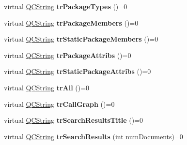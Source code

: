 \begin{DoxyCompactItemize}
\item 
\mbox{\label{class_translator_ad3328af2789b15e01a5050ffc7851d47}} 
virtual \mbox{\hyperlink{class_q_c_string}{Q\+C\+String}} {\bfseries tr\+Package\+Types} ()=0
\item 
\mbox{\label{class_translator_a55faa09f74a1f8abfcda6c3cfe444d3a}} 
virtual \mbox{\hyperlink{class_q_c_string}{Q\+C\+String}} {\bfseries tr\+Package\+Members} ()=0
\item 
\mbox{\label{class_translator_a697b586bce78781017d735e7988c6e4d}} 
virtual \mbox{\hyperlink{class_q_c_string}{Q\+C\+String}} {\bfseries tr\+Static\+Package\+Members} ()=0
\item 
\mbox{\label{class_translator_ac65b5c2a08b0b0df895d762ee1b90493}} 
virtual \mbox{\hyperlink{class_q_c_string}{Q\+C\+String}} {\bfseries tr\+Package\+Attribs} ()=0
\item 
\mbox{\label{class_translator_a186a1a9583c01752d452af26fd28d2b0}} 
virtual \mbox{\hyperlink{class_q_c_string}{Q\+C\+String}} {\bfseries tr\+Static\+Package\+Attribs} ()=0
\item 
\mbox{\label{class_translator_a008615452dda018b06bfea08a2d1d552}} 
virtual \mbox{\hyperlink{class_q_c_string}{Q\+C\+String}} {\bfseries tr\+All} ()=0
\item 
\mbox{\label{class_translator_a5f2fd294c6ca32ec48a76eff010b4ae0}} 
virtual \mbox{\hyperlink{class_q_c_string}{Q\+C\+String}} {\bfseries tr\+Call\+Graph} ()=0
\item 
\mbox{\label{class_translator_a39e01cdc61885a896f0ca9fbf700987d}} 
virtual \mbox{\hyperlink{class_q_c_string}{Q\+C\+String}} {\bfseries tr\+Search\+Results\+Title} ()=0
\item 
\mbox{\label{class_translator_aac55ca755f3f6bffc8baf2162bea7771}} 
virtual \mbox{\hyperlink{class_q_c_string}{Q\+C\+String}} {\bfseries tr\+Search\+Results} (int num\+Documents)=0
\item 
\mbox{\label{class_translator_a144382f5d8b61298e894387a7938559e}} 

\end{DoxyCompactItemize}
